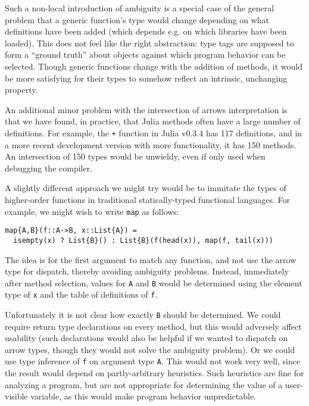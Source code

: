 
Such a non-local introduction of ambiguity is a special case of the
general problem that a generic function's type would change depending
on what definitions have been added (which depends e.g. on which libraries
have been loaded). This does not feel like the right abstraction:
type tags are supposed to form a ``ground truth'' about objects against
which program behavior can be selected. Though generic functions change
with the addition of methods, it would be more satisfying for their
types to somehow reflect an intrinsic, unchanging property.

An additional minor problem with the intersection of arrows
interpretation is that we have found, in practice, that Julia methods
often have a large number of definitions. For example, the \texttt{+}
function in Julia v0.3.4 has 117 definitions, and in a more recent
development version with more functionality, it has 150 methods. An
intersection of 150 types would be unwieldy, even if only
used when debugging the compiler.

A slightly different approach we might try would be to immitate
the types of higher-order functions in traditional
statically-typed functional languages. For example, we might wish
to write \texttt{map} as follows:

\begin{singlespace}
\begin{lstlisting}[style=customjulia]
map{A,B}(f::A->B, x::List{A}) =
  isempty(x) ? List{B}() : List{B}(f(head(x)), map(f, tail(x)))
\end{lstlisting}
\end{singlespace}

The idea is for the first argument to match any function, and not use
the arrow type for dispatch, thereby avoiding ambiguity problems.
Instead, immediately after method selection, values for \texttt{A} and
\texttt{B} would be determined using the element type of \texttt{x}
and the table of definitions of \texttt{f}.

Unfortunately it is not clear how exactly \texttt{B} should be
determined. We could require return type declarations on every method,
but this would adversely affect usability (such declarations would also
be helpful if we wanted to dispatch on arrow types, though they would
not solve the ambiguity problem). Or we could use type inference
of \texttt{f} on argument type \texttt{A}. This would not work very
well, since the result would depend on partly-arbitrary heuristics.
Such heuristics are fine for analyzing a program, but
are not appropriate for determining the value of a user-visible
variable, as this would make program behavior unpredictable.


